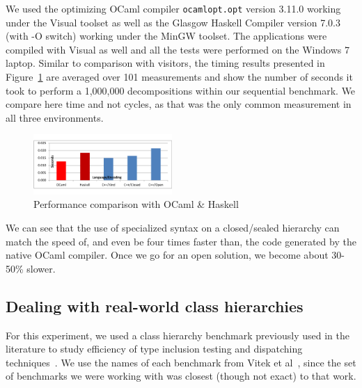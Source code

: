 
We used the optimizing OCaml compiler \texttt{ocamlopt.opt} version 3.11.0 working 
under the Visual \Cpp{} toolset as well as the Glasgow Haskell Compiler version 
7.0.3 (with -O switch) working under the MinGW toolset. The \Cpp{} applications 
were compiled with Visual \Cpp{} as well and all the tests were  
performed on the Windows 7 laptop. Similar to comparison with visitors,
the timing results presented in Figure~\ref{fig:OCamlComparison} are averaged 
over 101 measurements and show the number of seconds it took to perform a 
1,000,000 decompositions within our sequential benchmark. We compare here time 
and not cycles, as that was the only common measurement in all three 
environments.

\begin{figure}[htbp]
  \centering
    \includegraphics[width=0.47\textwidth]{OCamlComparison.pdf}
  \caption{Performance comparison with OCaml \& Haskell}
  \label{fig:OCamlComparison}
\end{figure}

We can see that the use of specialized syntax on a closed/sealed hierarchy can 
match the speed of, and even be four times faster than, the code generated by 
the native OCaml compiler. Once we go for an open solution, we become about 
30-50\% slower. 

\subsection{Dealing with real-world class hierarchies}
\label{sec:hierarchies}

For this experiment, we used a class hierarchy benchmark previously used in the 
literature to study efficiency of type inclusion testing and dispatching 
techniques~\cite{Vitek97,Krall97nearoptimal,PQEncoding,Ducournau08}.
We use the names of each benchmark from Vitek et al~\cite[Table 2]{Vitek97}, 
since the set of benchmarks we were working with was closest (though not exact) 
to that work.


